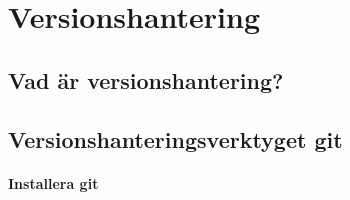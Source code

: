 

\chapter{Versionshantering}

\section{Vad är versionshantering?}

\section{Versionshanteringsverktyget git}

\subsubsection{Installera git}